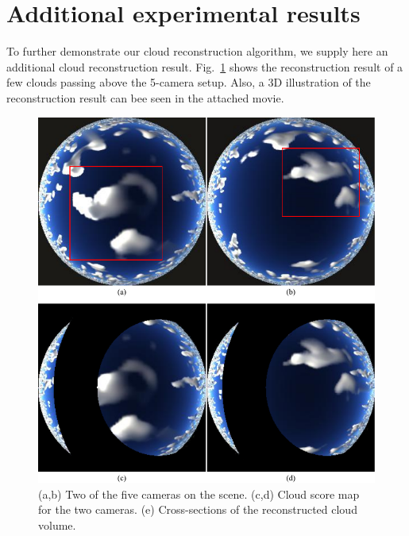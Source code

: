 \documentclass[runningheads]{llncs}
\begin{document}
\section{Additional experimental results}
\label{sec:addexp}

To further demonstrate our cloud reconstruction algorithm, we supply here an additional cloud reconstruction result. Fig.~\ref{fig:scene} shows the reconstruction result of a few clouds passing above the 5-camera setup.
Also, a 3D illustration of the reconstruction result can bee seen in the attached movie.

\begin{figure}
  \begin{center}
    \includegraphics{figures/simulation_imgs}
    \caption{(a,b) Two of the five cameras on the scene. (c,d) Cloud score map for the two cameras. (e) Cross-sections of the reconstructed cloud volume.}
    \label{fig:scene}
  \end{center}
\end{figure}




\end{document}
